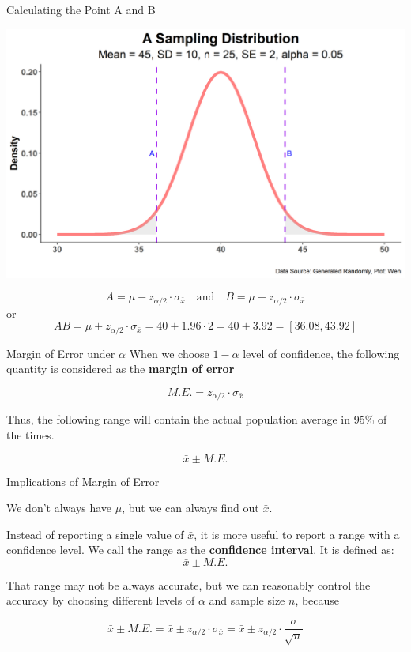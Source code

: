 \documentclass{beamer}
\begin{document}
\begin{frame}{Calculating the Point A and B}

\begin{center}
\includegraphics[scale=0.4]{images/normalDistAreaSamplingDistMean45SE2.png}
\end{center}
$$ A = \mu - z_{\alpha/2} \cdot \sigma_{\bar{x}} \quad \text{and} \quad B = \mu + z_{\alpha/2} \cdot \sigma_{\bar{x}} $$
or
$$ AB = \mu \pm z_{\alpha/2} \cdot \sigma_{\bar{x}} = 40 \pm 1.96 \cdot 2 = 40 \pm 3.92 = [36.08, 43.92] $$

\end{frame}


\begin{frame}{Margin of Error under $\alpha$}
When we choose $1 - \alpha$ level of confidence, the following quantity is considered as the \textbf{margin of error} 

$$M.E. = z_{\alpha/2} \cdot \sigma_{\bar{x}}$$

Thus, the following range will contain the actual population average in 95\% of the times.

$$\bar{x} \pm M.E. $$

\end{frame}


\begin{frame}{Implications of Margin of Error}


We don't always have $\mu$, but we can always find out $\bar{x}$.

\vspace{0.3 cm}
Instead of reporting a single value of $\bar{x}$, it is more useful to report a range with  a confidence level. We call the range as the \textbf{confidence interval}. It is defined as: 
$$ \bar{x} \pm M.E. $$

\vspace{0.3 cm}
That range may not be always accurate, but we can reasonably control the accuracy by choosing different levels of $\alpha$ and sample size $n$, because

$$\bar{x} \pm M.E. = \bar{x} \pm z_{\alpha/2} \cdot \sigma_{\bar{x}} = \bar{x} \pm z_{\alpha/2}\cdot \frac{\sigma}{\sqrt{n}}$$


\end{frame}
\end{document}

